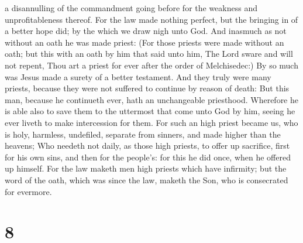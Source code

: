 a disannulling of the commandment going before for the weakness and
unprofitableness thereof.  For the law made nothing
perfect, but the bringing in of a better hope did; by the which we draw
nigh unto God.  And inasmuch as not without an oath he
was made priest:  (For those priests were made without an
oath; but this with an oath by him that said unto him, The Lord sware
and will not repent, Thou art a priest for ever after the order of
Melchisedec:)  By so much was Jesus made a surety of a
better testament.  And they truly were many priests,
because they were not suffered to continue by reason of death:
 But this man, because he continueth ever, hath an
unchangeable priesthood.  Wherefore he is able also to
save them to the uttermost that come unto God by him, seeing he ever
liveth to make intercession for them.  For such an high
priest became us, who is holy, harmless, undefiled, separate from
sinners, and made higher than the heavens;  Who needeth
not daily, as those high priests, to offer up sacrifice, first for his
own sins, and then for the people's: for this he did once, when he
offered up himself.  For the law maketh men high priests
which have infirmity; but the word of the oath, which was since the law,
maketh the Son, who is consecrated for evermore.

\hypertarget{section-7}{%
\section{8}\label{section-7}}

